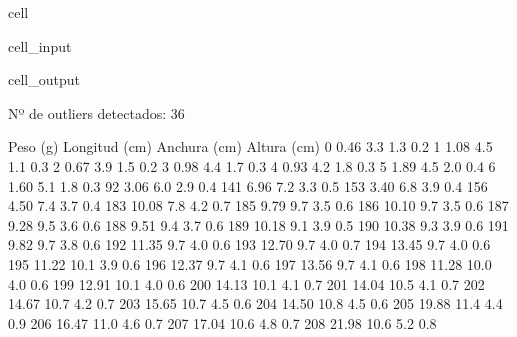 \documentclass[a4paper,10pt,spanish]{jupyterBook}
\begin{document}
\begin{sphinxuseclass}{cell}
\begin{sphinxVerbatimInput}
\begin{sphinxuseclass}{cell_input}
\begin{sphinxVerbatim}[commandchars=\\\{\}]
\end{sphinxVerbatim}

\end{sphinxuseclass}\end{sphinxVerbatimInput}
\begin{sphinxVerbatimOutput}

\begin{sphinxuseclass}{cell_output}
\begin{sphinxVerbatim}[commandchars=\\\{\}]
Nº de outliers detectados: 36
\end{sphinxVerbatim}

\begin{sphinxVerbatim}[commandchars=\\\{\}]
     Peso (g)  Longitud (cm)  Anchura (cm)  Altura (cm)
0        0.46            3.3           1.3          0.2
1        1.08            4.5           1.1          0.3
2        0.67            3.9           1.5          0.2
3        0.98            4.4           1.7          0.3
4        0.93            4.2           1.8          0.3
5        1.89            4.5           2.0          0.4
6        1.60            5.1           1.8          0.3
92       3.06            6.0           2.9          0.4
141      6.96            7.2           3.3          0.5
153      3.40            6.8           3.9          0.4
156      4.50            7.4           3.7          0.4
183     10.08            7.8           4.2          0.7
185      9.79            9.7           3.5          0.6
186     10.10            9.7           3.5          0.6
187      9.28            9.5           3.6          0.6
188      9.51            9.4           3.7          0.6
189     10.18            9.1           3.9          0.5
190     10.38            9.3           3.9          0.6
191      9.82            9.7           3.8          0.6
192     11.35            9.7           4.0          0.6
193     12.70            9.7           4.0          0.7
194     13.45            9.7           4.0          0.6
195     11.22           10.1           3.9          0.6
196     12.37            9.7           4.1          0.6
197     13.56            9.7           4.1          0.6
198     11.28           10.0           4.0          0.6
199     12.91           10.1           4.0          0.6
200     14.13           10.1           4.1          0.7
201     14.04           10.5           4.1          0.7
202     14.67           10.7           4.2          0.7
203     15.65           10.7           4.5          0.6
204     14.50           10.8           4.5          0.6
205     19.88           11.4           4.4          0.9
206     16.47           11.0           4.6          0.7
207     17.04           10.6           4.8          0.7
208     21.98           10.6           5.2          0.8
\end{sphinxVerbatim}


\end{sphinxuseclass}
\end{sphinxVerbatimOutput}
\end{sphinxuseclass}
\end{document}
